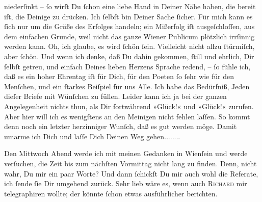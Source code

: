                niederſinkt –{ }ſo wirſt Du{ }ſchon eine liebe Hand in Deiner Nähe haben, die bereit iſt,
               die Deinige zu drücken. Ich{ }ſelbſt bin Deiner Sache{ }ſicher.  Für mich kann es{ }ſich nur um die Größe des Erfolges handeln; ein Mißerfolg iſt
               ausgeſchloſſen,  aus dem einfachen Grunde, weil
               nicht das ganze Wiener Publicum plötzlich
               irrſinnig werden kann. Oh, ich glaube, es wird{ }ſchön{ }ſein. Vielleicht nicht allzu{ }ſtürmiſch, aber{ }ſchön. Und wenn ich denke, {\pb}daß Du
               dahin gekommen,{ }ſtill und ehrlich, Dir ſelbſt
               getreu, und einfach Deines lieben Herzens Sprache redend, –{ }ſo fühle ich, daß es ein
               hoher Ehrentag iſt für Dich, für den Poeten{ }ſo{ }ſehr
               wie für den Menſchen, und ein{ }ſtarkes Beiſpiel für uns Alle. Ich habe das Bedürfniß,
               Jeden dieſer Briefe mit Wünſchen zu füllen. Leider kann ich ja bei der ganzen
               Angelegenheit nichts thun, als Dir fortwährend »Glück!« und »Glück!« zurufen. Aber
               hier will ich es wenigſtens an den Meinigen nicht {\pb}fehlen laſſen. So kommt denn noch ein letzter herzinniger Wunſch, daß es gut werden
               möge. Damit umarme ich Dich und laſſe Dich Deinen Weg gehen........\pend
           
\pstart
           Den Mittwoch{ }Abend werde ich mit meinen Gedanken in Wienſein und werde verſuchen, die Zeit bis zum nächſten
                  Vormittag nicht lang zu finden. Denn, nicht wahr, Du \label{K_L02750-2v}\label{K_L02750-2} mir ein paar Worte? Und dann{ }ſchickſt Du mir auch wohl die
               Referate, ich{ }ſende {\pb}ſie Dir umgehend zurück. Sehr
               lieb wäre es, wenn auch \textsc{Richard} mir telegraphiren wollte; der könnte{ }ſchon etwas ausführlicher berichten.\pend
           
